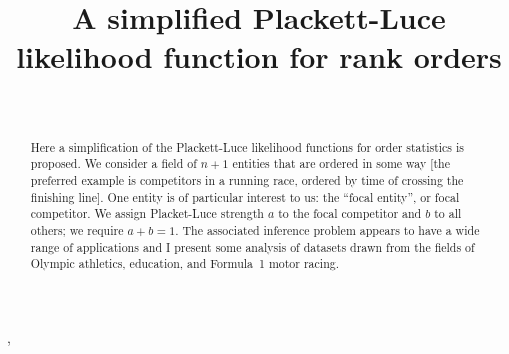 \documentclass[ejs,noshowframe]{imsart}
\theoremstyle{plain}
\theoremstyle{definition}
\theoremstyle{remark}
\begin{document}
\begin{frontmatter}
\title{A simplified Plackett-Luce likelihood function for rank orders}

\begin{aug}
\author[A]{~},
\address[A]{Computer Science and Mathematics,
University of Stirling}

\end{aug}

\begin{abstract}
Here a simplification of the Plackett-Luce likelihood functions for
order statistics is proposed.  We consider a field of $n+1$ entities
that are ordered in some way [the preferred example is competitors in
  a running race, ordered by time of crossing the finishing line].
One entity is of particular interest to us: the ``focal entity'', or
focal competitor.  We assign Placket-Luce strength $a$ to the focal
competitor and $b$ to all others; we require $a+b=1$.  The associated
inference problem appears to have a wide range of applications and I
present some analysis of datasets drawn from the fields of Olympic
athletics, education, and Formula~1 motor racing.
\end{abstract}

\begin{keyword}[class=MSC]
\end{keyword}


\end{frontmatter}
\end{document}
